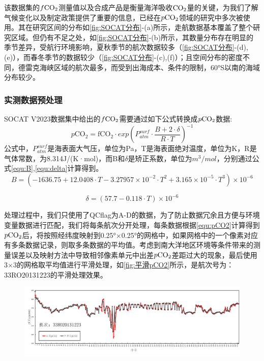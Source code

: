该数据集的$f\rm CO_2$测量值以及合成产品是衡量海洋吸收$\rm CO_2$量的关键，为我们了解气候变化以及制定政策提供了重要的信息，已经在$p\rm CO_2$领域的研究中多次被使用\cite{CSIR_ML6,MPI_SOMFFN}。其在研究区间的分布如\autoref{fig:SOCAT分布}-(a)所示，走航数据基本覆盖了整个研究区域。但仍有不足之处，如\autoref{fig:SOCAT分布}-(b)所示，其数量分布存在明显的季节差异，受航行环境影响，夏秋季节的航次数据较多（\autoref{fig:SOCAT分布}-(d),(e)），而春冬季节的数据较少（\autoref{fig:SOCAT分布}-(c),(f)）；且空间分布的密度不同，德雷克海峡区域的航次最多，而受到出海成本、条件的限制，60°S以南的海域分布较少。

\subsubsection{实测数据预处理}
SOCAT V2023数据集中给出的$f\rm CO_2$需要通过如下公式转换成$p\rm CO_2$数据:
\begin{equation}
    \label{equ:pCO2}
   p\mathrm{CO_2} = \mathrm{fCO_2} \cdot exp(P_{atm}^{surf} \cdot \frac{B + 2\cdot \delta}{R \cdot T})^{-1}
\end{equation}
公式中，$P_{atm}^{surf}$是海表面大气压，单位为Pa，T是海表面绝对温度，单位为K，R是气体常数，为8.314J/(K·mol)，而B和$\delta$是矫正系数，单位为$m^3/mol$，分别通过公式\autoref{equ:B},\autoref{equ:delta}计算得到。
\begin{equation}
    \label{equ:B}
   B= (-1636.75 + 12.0408\cdot T - 3.27957 \times 10^{-2}\cdot T^2 +3.165\times 10^{-5}\cdot T^{3})\times 10^{-6}
\end{equation}

\begin{equation}
    \label{equ:delta}
   \delta = (57.7 - 0.118\cdot T)\times 10^{-6}
\end{equation}

处理过程中，我们只使用了QCflag为A-D的数据，为了防止数据冗余且方便与环境变量数据进行匹配，我们将每条航次分开处理，每条数据根据\autoref{equ:pCO2}计算得到$p\rm CO_2$后，将按照经纬度映射到0.25°×0.25°的网格中，如果网格中的一个像素对应有多条数据记录，则取多条数据的平均值。考虑到南大洋地区环境等条件带来的测量误差以及映射方法中导致相邻像素单元中出差$p\rm CO_2$差距过大的现象，最后使用3×3的网格取平均值进行平滑处理，如\autoref{fig:平滑pCO2}所示，是航次号为：33RO20131223的平滑处理效果。
\begin{figure}[htbp]
    \centering
    \includegraphics[width=\linewidth]{figure/第二章用图/平滑pCO2.jpg}
\end{figure}


